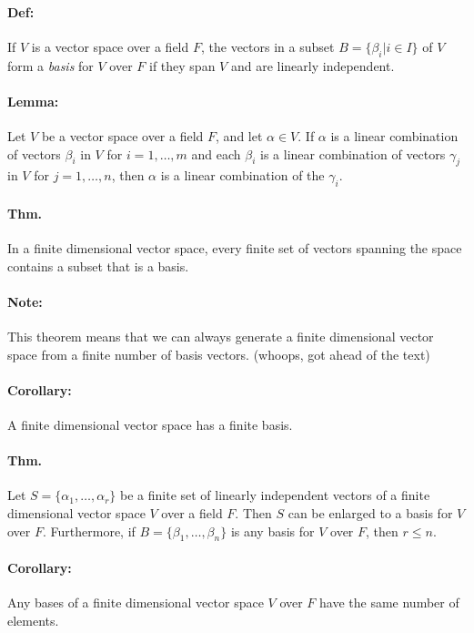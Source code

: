 \documentclass[10pt,a4paper]{article}
\begin{document}
\paragraph{Def:} If $V$ is a vector space over a field $F$, the vectors in a subset $B = \{ \beta_i | i \in I \}$ of $V$ form a \textit{basis} for $V$ over $F$ if they span $V$ and are linearly independent.

\paragraph{Lemma:} Let $V$ be a vector space over a field $F$, and let $\alpha \in V$. If $\alpha$ is a linear combination of vectors $\beta_i$ in $V$ for $i=1,\dots,m$ and each $\beta_i$ is a linear combination of vectors $\gamma_j$ in $V$ for $j=1,\dots,n$, then $\alpha$ is a linear combination of the $\gamma_i$.

\paragraph{Thm.} In a finite dimensional vector space, every finite set of vectors spanning the space contains a subset that is a basis.

\paragraph{Note:} This theorem means that we can always generate a finite dimensional vector space from a finite number of basis vectors. (whoops, got ahead of the text)

\paragraph{Corollary:} A finite dimensional vector space has a finite basis.

\paragraph{Thm.} Let $S = \{\alpha_1,\dots,\alpha_r\}$ be a finite set of linearly independent vectors of a finite dimensional vector space $V$ over a field $F$. Then $S$ can be enlarged to a basis for $V$ over $F$. Furthermore, if $B = \{\beta_1, \dots, \beta_n\}$ is any basis for $V$ over $F$, then $r \leq n$.

\paragraph{Corollary:} Any bases of a finite dimensional vector space $V$ over $F$ have the same number of elements.
\end{document}
